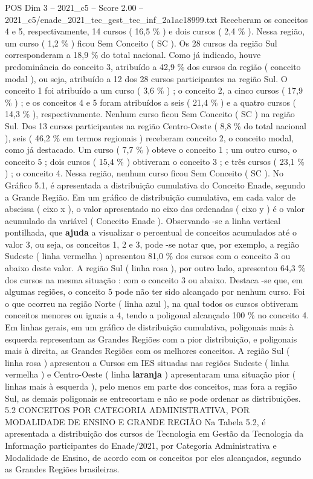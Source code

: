\begin{textsample}{POS Dim 3 – 2021\_c5 – Score 2.00 – 2021\_c5/enade\_2021\_tec\_gest\_tec\_inf\_2a1ac18999.txt}
Receberam os conceitos 4 e 5, respectivamente, 14 cursos ( 16,5 \% ) e dois cursos ( 2,4 \% ).
Nessa região, um curso ( 1,2 \% ) ficou Sem Conceito ( SC ).
Os 28 cursos da região Sul corresponderam a 18,9 \% do total nacional.
Como já indicado, houve predominância do conceito 3, atribuído a 42,9 \% dos cursos da região ( conceito modal ), ou seja, atribuído a 12 dos 28 cursos participantes na região Sul.
O conceito 1 foi atribuído a um curso ( 3,6 \% ) ; o conceito 2, a cinco cursos ( 17,9 \% ) ; e os conceitos 4 e 5 foram atribuídos a seis ( 21,4 \% ) e a quatro cursos ( 14,3 \% ), respectivamente.
Nenhum curso ficou Sem Conceito ( SC ) na região Sul.
Dos 13 cursos participantes na região Centro-Oeste ( 8,8 \% do total nacional ), seis ( 46,2 \% em termos regionais ) receberam conceito 2, o conceito modal, como já destacado.
Um curso ( 7,7 \% ) obteve o conceito 1 ; um outro curso, o conceito 5 ; dois cursos ( 15,4 \% ) obtiveram o conceito 3 ; e três cursos ( 23,1 \% ) ; o conceito 4.
Nessa região, nenhum curso ficou Sem Conceito ( SC ).
No Gráfico 5.1, é apresentada a distribuição cumulativa do Conceito Enade, segundo a Grande Região.
Em um gráfico de distribuição cumulativa, em cada valor de abscissa ( eixo x ), o valor apresentado no eixo das ordenadas ( eixo y ) é o valor acumulado da variável ( Conceito Enade ).
Observando -se a linha vertical pontilhada, que \textbf{ajuda} a visualizar o percentual de conceitos acumulados até o valor 3, ou seja, os conceitos 1, 2 e 3, pode -se notar que, por exemplo, a região Sudeste ( linha vermelha ) apresentou 81,0 \% dos cursos com o conceito 3 ou abaixo deste valor.
A região Sul ( linha rosa ), por outro lado, apresentou 64,3 \% dos cursos na mesma situação : com o conceito 3 ou abaixo.
Destaca -se que, em algumas regiões, o conceito 5 pode não ter sido alcançado por nenhum curso.
Foi o que ocorreu na região Norte ( linha azul ), na qual todos os cursos obtiveram conceitos menores ou iguais a 4, tendo a poligonal alcançado 100 \% no conceito 4.
Em linhas gerais, em um gráfico de distribuição cumulativa, poligonais mais à esquerda representam as Grandes Regiões com a pior distribuição, e poligonais mais à direita, as Grandes Regiões com os melhores conceitos.
A região Sul ( linha rosa ) apresentou a Cursos em IES situadas nas regiões Sudeste ( linha vermelha ) e Centro-Oeste ( linha \textbf{laranja} ) apresentaram uma situação pior ( linhas mais à esquerda ), pelo menos em parte dos conceitos, mas fora a região Sul, as demais poligonais se entrecortam e não se pode ordenar as distribuições. 5.2 CONCEITOS POR CATEGORIA ADMINISTRATIVA, POR MODALIDADE DE ENSINO E GRANDE REGIÃO Na Tabela 5.2, é apresentada a distribuição dos cursos de Tecnologia em Gestão da Tecnologia da Informação participantes do Enade/2021, por Categoria Administrativa e Modalidade de Ensino, de acordo com os conceitos por eles alcançados, segundo as Grandes Regiões brasileiras.

\end{textsample}
